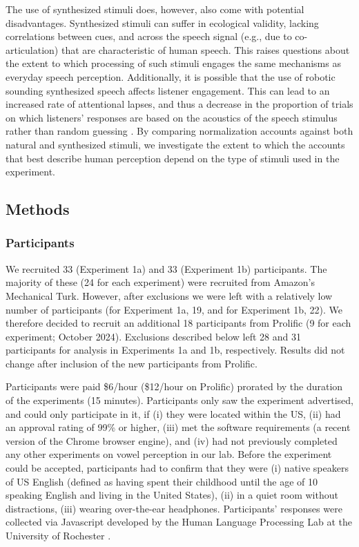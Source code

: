 \documentclass[preprint]{JASA}
\begin{document}
The use of synthesized stimuli does, however, also come with potential disadvantages. Synthesized stimuli can suffer in ecological validity, lacking correlations between cues, and across the speech signal (e.g., due to co-articulation) that are characteristic of human speech. This raises questions about the extent to which processing of such stimuli engages the same mechanisms as everyday speech perception. Additionally, it is possible that the use of robotic sounding synthesized speech affects listener engagement. This can lead to an increased rate of attentional lapses, and thus a decrease in the proportion of trials on which listeners' responses are based on the acoustics of the speech stimulus rather than random guessing \citep[compare, e.g.,][]{kleinschmidt2020, tan-jaeger2024}. By comparing normalization accounts against both natural and synthesized stimuli, we investigate the extent to which the accounts that best describe human perception depend on the type of stimuli used in the experiment.

\subsection{Methods}\label{sec:methods}

\subsubsection{Participants}\label{sec:participants}

We recruited 33 (Experiment 1a) and 33 (Experiment 1b) participants. The majority of these (24 for each experiment) were recruited from Amazon's Mechanical Turk. However, after exclusions we were left with a relatively low number of participants (for Experiment 1a, 19, and for Experiment 1b, 22). We therefore decided to recruit an additional 18 participants from Prolific (9 for each experiment; October 2024). Exclusions described below left 28 and 31 participants for analysis in Experiments 1a and 1b, respectively. Results did not change after inclusion of the new participants from Prolific.

Participants were paid \$6/hour (\$12/hour on Prolific) prorated by the duration of the experiments (15 minutes). Participants only saw the experiment advertised, and could only participate in it, if (i) they were located within the US, (ii) had an approval rating of 99\% or higher, (iii) met the software requirements (a recent version of the Chrome browser engine), and (iv) had not previously completed any other experiments on vowel perception in our lab. Before the experiment could be accepted, participants had to confirm that they were (i) native speakers of US English (defined as having spent their childhood until the age of 10 speaking English and living in the United States), (ii) in a quiet room without distractions, (iii) wearing over-the-ear headphones. Participants' responses were collected via Javascript developed by the Human Language Processing Lab at the University of Rochester \citep{kleinschmidt2021}.
\end{document}
